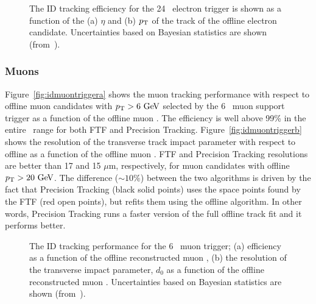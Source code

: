 				\begin{figure}[!htb]
					\centering
					\caption{The ID tracking efficiency for the 24 \GeV\ electron trigger is shown as a function of the (a) $\eta$ and (b) $p_{\mathrm{T}}$ of the track of the offline electron candidate. Uncertainties based on Bayesian statistics are shown (from~\cite{ATLASTrigger2015}).}
					\label{fig:ele_idtrig_eff}
				\end{figure}

			\subsubsection*{Muons}

				Figure~\ref{fig:idmuontriggera} shows the muon tracking performance with respect to offline muon candidates with $\pt > 6 \GeV$ selected by the 6 \GeV\ muon support trigger as a function of the offline muon \pt. The efficiency is well above 99\% in the entire \pt\ range for both \ac{FTF} and Precision Tracking. Figure~\ref{fig:idmuontriggerb} shows the resolution of the transverse track impact parameter with respect to offline as a function of the offline muon \pt. \ac{FTF} and Precision Tracking resolutions are better than 17 and 15 $\mu$m, respectively, for muon candidates with offline $\pt > 20 \GeV$. The difference ($\sim 10\%$) between the two algorithms is driven by the fact that Precision Tracking (black solid points) uses the space points found by the \ac{FTF} (red open points), but refits them using the offline algorithm. In other words, Precision Tracking runs a faster version of the full offline track fit and it performs better.

				\begin{figure}[!htb]
					\centering
					\caption{ 
					The ID tracking performance for the 6 \GeV\ muon trigger;
					(a) efficiency as a function of the offline reconstructed muon \pt,  
					(b) the resolution of the transverse impact parameter, $d_{0}$  as a function of the offline reconstructed muon \pt. Uncertainties based on Bayesian statistics are shown (from~\cite{ATLASTrigger2015}).}
				\label{fig:idmuontrigger}
				\end{figure}



